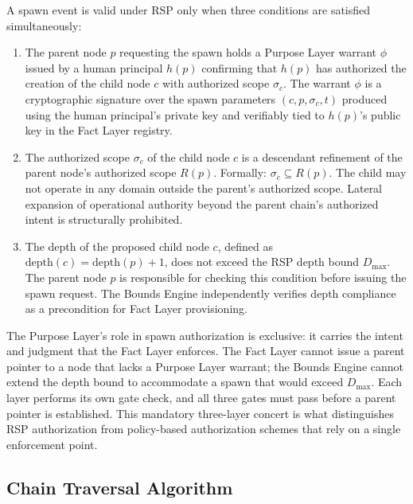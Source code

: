 A spawn event is valid under RSP only when three conditions are satisfied simultaneously:

\begin{enumerate}
    \item[(S1) \textbf{Human authorization.}] The parent node $p$ requesting the spawn holds a Purpose Layer warrant $\phi$ issued by a human principal $h(p)$ confirming that $h(p)$ has authorized the creation of the child node $c$ with authorized scope $\sigma_c$. The warrant $\phi$ is a cryptographic signature over the spawn parameters $(c, p, \sigma_c, t)$ produced using the human principal's private key and verifiably tied to $h(p)$'s public key in the Fact Layer registry.

    \item[(S2) \textbf{Scope refinement.}] The authorized scope $\sigma_c$ of the child node $c$ is a descendant refinement of the parent node's authorized scope $R(p)$. Formally: $\sigma_c \subseteq R(p)$. The child may not operate in any domain outside the parent's authorized scope. Lateral expansion of operational authority beyond the parent chain's authorized intent is structurally prohibited.

    \item[(S3) \textbf{Depth availability.}] The depth of the proposed child node $c$, defined as $\mathrm{depth}(c) = \mathrm{depth}(p) + 1$, does not exceed the RSP depth bound $D_{\max}$. The parent node $p$ is responsible for checking this condition before issuing the spawn request. The Bounds Engine independently verifies depth compliance as a precondition for Fact Layer provisioning.
\end{enumerate}

The Purpose Layer's role in spawn authorization is exclusive: it carries the intent and judgment that the Fact Layer enforces. The Fact Layer cannot issue a parent pointer to a node that lacks a Purpose Layer warrant; the Bounds Engine cannot extend the depth bound to accommodate a spawn that would exceed $D_{\max}$. Each layer performs its own gate check, and all three gates must pass before a parent pointer is established. This mandatory three-layer concert is what distinguishes RSP authorization from policy-based authorization schemes that rely on a single enforcement point.

\subsection{Chain Traversal Algorithm}
\label{sec:chain-traversal-algorithm}

